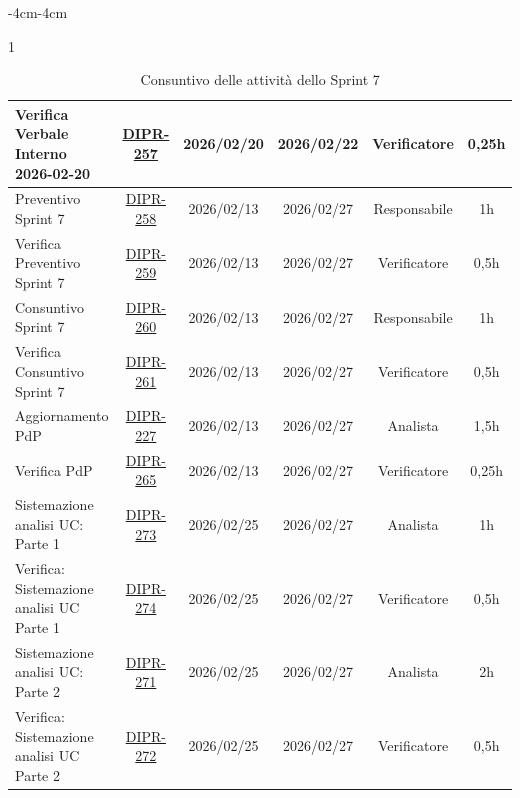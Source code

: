 \documentclass[a4paper,12pt]{article}
\begin{document}
\begin{table}[H]
\begin{adjustwidth}{-4cm}{-4cm}
\begin{spacing}{1}
\begin{tabular}{|p{4cm}|c|c|c|c|c|}
        \hline
        Verifica Verbale Interno 2026-02-20 & \href{https://7zpus.atlassian.net/browse/DIPR-257}{DIPR-257} & 2026/02/20 & 2026/02/22 & Verificatore & 0,25h \\
        \hline
        Preventivo Sprint 7 & \href{https://7zpus.atlassian.net/browse/DIPR-258}{DIPR-258} & 2026/02/13 & 2026/02/27 & Responsabile & 1h \\
        \hline
        Verifica Preventivo Sprint 7 & \href{https://7zpus.atlassian.net/browse/DIPR-259}{DIPR-259} & 2026/02/13 & 2026/02/27 & Verificatore & 0,5h \\
        \hline
        Consuntivo Sprint 7 & \href{https://7zpus.atlassian.net/browse/DIPR-260}{DIPR-260} & 2026/02/13 & 2026/02/27 & Responsabile & 1h \\
        \hline
        Verifica Consuntivo Sprint 7 & \href{https://7zpus.atlassian.net/browse/DIPR-261}{DIPR-261} & 2026/02/13 & 2026/02/27 & Verificatore & 0,5h \\
        \hline
        Aggiornamento PdP & \href{https://7zpus.atlassian.net/browse/DIPR-227}{DIPR-227} & 2026/02/13 & 2026/02/27 & Analista & 1,5h \\
        \hline
        Verifica PdP & \href{https://7zpus.atlassian.net/browse/DIPR-265}{DIPR-265} & 2026/02/13 & 2026/02/27 & Verificatore & 0,25h \\
        \hline
        Sistemazione analisi UC: Parte 1 & \href{https://7zpus.atlassian.net/browse/DIPR-273}{DIPR-273} & 2026/02/25 & 2026/02/27 & Analista & 1h \\
        \hline
        Verifica: Sistemazione analisi UC Parte 1 & \href{https://7zpus.atlassian.net/browse/DIPR-274}{DIPR-274} & 2026/02/25 & 2026/02/27 & Verificatore & 0,5h \\
        \hline
        Sistemazione analisi UC: Parte 2 & \href{https://7zpus.atlassian.net/browse/DIPR-271}{DIPR-271} & 2026/02/25 & 2026/02/27 & Analista & 2h \\
        \hline
        Verifica: Sistemazione analisi UC Parte 2 & \href{https://7zpus.atlassian.net/browse/DIPR-272}{DIPR-272} & 2026/02/25 & 2026/02/27 & Verificatore & 0,5h \\
        \hline

    \end{tabular}
    \end{spacing}
    \caption{Consuntivo delle attività dello Sprint 7}
    \end{adjustwidth}
\end{table}
\end{document}
